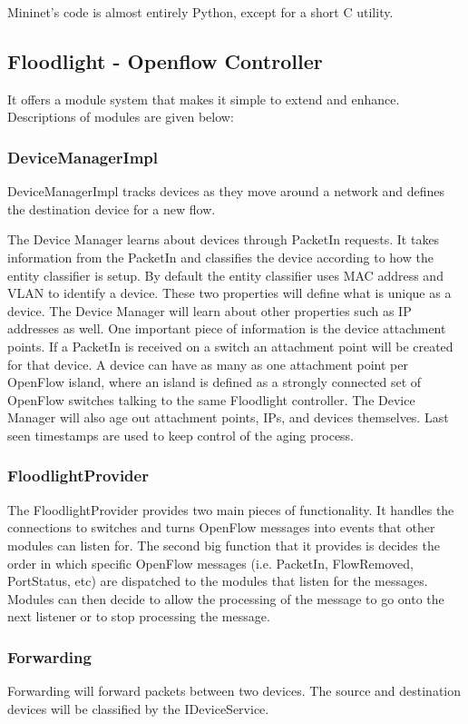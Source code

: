 \documentclass[12pt,a4paper]{article}
\begin{document}
Mininet's code is almost entirely Python, except for a short C utility.


\subsection{Floodlight - Openflow Controller}
It\cite{modules} offers a module system that makes it simple to extend and enhance. Descriptions of modules are given below:

\subsubsection{DeviceManagerImpl}

DeviceManagerImpl tracks devices as they move around a network and defines the destination device for a new flow.

The Device Manager learns about devices through PacketIn requests. It takes information from the PacketIn and classifies the device according to how the entity classifier is setup. By default the entity classifier uses MAC address and VLAN to identify a device. These two properties will define what is unique as a device. The Device Manager will learn about other properties such as IP addresses as well. One important piece of information is the device attachment points. If a PacketIn is received on a switch an attachment point will be created for that device. A device can have as many as one attachment point per OpenFlow island, where an island is defined as a strongly connected set of OpenFlow switches talking to the same Floodlight controller. The Device Manager will also age out attachment points, IPs, and devices themselves. Last seen timestamps are used to keep control of the aging process.

\subsubsection{FloodlightProvider}
The FloodlightProvider provides two main pieces of functionality. It handles the connections to switches and turns OpenFlow messages into events that other modules can listen for. The second big function that it provides is decides the order in which specific OpenFlow messages (i.e. PacketIn, FlowRemoved, PortStatus, etc) are dispatched to the modules that listen for the messages. Modules can then decide to allow the processing of the message to go onto the next listener or to stop processing the message.

\subsubsection{Forwarding}
Forwarding will forward packets between two devices. The source and destination devices will be classified by the IDeviceService.
\end{document}
